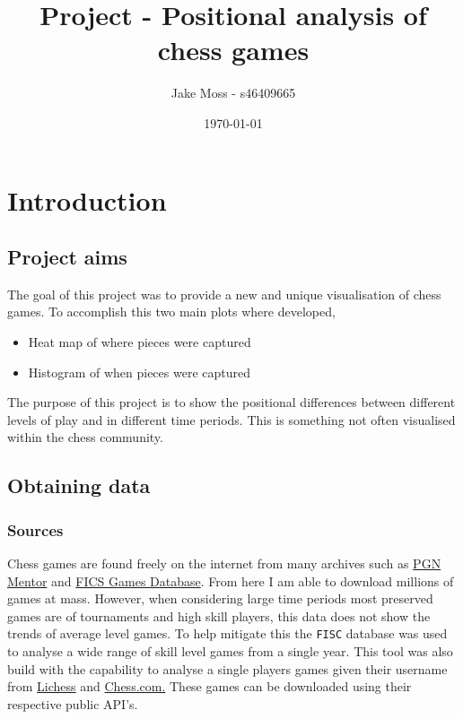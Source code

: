 \documentclass[11pt]{article}
\author{Jake Moss - s46409665}
\date{\today}
\title{Project - Positional analysis of chess games}
\begin{document}
\maketitle
\tableofcontents

\newpage

\section{Introduction}
\label{sec:org5ae5faa}
\subsection{Project aims}
\label{sec:orga506a2e}
The goal of this project was to provide a new and unique visualisation of chess games. To accomplish this two main plots where developed,

\begin{itemize}
\item Heat map of where pieces were captured
\item Histogram of when pieces were captured
\end{itemize}

The purpose of this project is to show the positional differences between different levels of play and in different time periods. This is something not often visualised within the chess community.
\subsection{Obtaining data}
\label{sec:orge5ab2bf}
\subsubsection{Sources}
\label{sec:org0c71eb1}
Chess games are found freely on the internet from many archives such as \href{https://www.pgnmentor.com/files.html}{PGN Mentor} and \href{https://www.ficsgames.org/download.html}{FICS Games Database}. From here I am able to download millions of games at mass. However, when considering large time periods most preserved games are of tournaments and high skill players, this data does not show the trends of average level games. To help mitigate this the \texttt{FISC} database was used to analyse a wide range of skill level games from a single year.
This tool was also build with the capability to analyse a single players games given their username from \href{https://lichess.org/}{Lichess} and \href{https://www.chess.com/}{Chess.com.} These games can be downloaded using their respective public API's.
\end{document}
